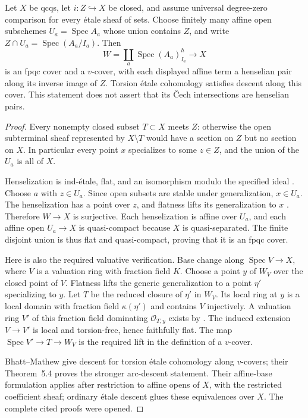 \begin{lemma}\label{B:henselized-affine-cover}
Let $X$ be qcqs, let $i:Z\hookrightarrow X$ be closed, and assume
universal degree-zero comparison for every \'etale sheaf of sets.
Choose finitely many affine open subschemes
$U_a=\operatorname{Spec}A_a$ whose union contains $Z$, and write
$Z\cap U_a=\operatorname{Spec}(A_a/I_a)$. Then
\[
 W=\coprod_a\operatorname{Spec}(A_a)^h_{I_a}\longrightarrow X
\]
is an fpqc cover and a $v$-cover, with each displayed affine term
a henselian pair along its inverse image of $Z$. Torsion \'etale
cohomology satisfies descent along this cover. This statement
does not assert that its \v Cech intersections are henselian pairs.
\end{lemma}
\begin{proof}
Every nonempty closed subset $T\subset X$ meets $Z$: otherwise
the open subterminal sheaf represented by $X\setminus T$ would
have a section on $Z$ but no section on $X$. In particular every
point $x$ specializes to some $z\in Z$, and the union of the
$U_a$ is all of $X$.

Henselization is ind-\'etale, flat, and an isomorphism modulo the
specified ideal \cite[Tag 0AGU]{BStacks}. Choose $a$ with
$z\in U_a$. Since open subsets are stable under generalization,
$x\in U_a$. The henselization has a point over $z$, and flatness
lifts its generalization to $x$ \cite[Tag 03HV]{BStacks}.
Therefore $W\to X$ is surjective. Each henselization is affine
over $U_a$, and each affine open $U_a\to X$ is quasi-compact
because $X$ is quasi-separated. The finite disjoint union is
thus flat and quasi-compact, proving that it is an fpqc cover.

Here is also the required valuative verification. Base change
along $\operatorname{Spec}V\to X$, where $V$ is a valuation
ring with fraction field $K$. Choose a point $y$ of $W_V$ over
the closed point of $V$. Flatness lifts the generic
generalization to a point $\eta'$ specializing to $y$. Let $T$
be the reduced closure of $\eta'$ in $W_V$. Its local ring at
$y$ is a local domain with fraction field $\kappa(\eta')$ and
contains $V$ injectively. A valuation ring $V'$ of this fraction
field dominating $\mathcal O_{T,y}$ exists by
\cite[Tag 00IA]{BStacks}. The induced extension $V\to V'$ is
local and torsion-free, hence faithfully flat. The map
$\operatorname{Spec}V'\to T\to W_V$ is the required lift in
the definition of a $v$-cover.

Bhatt--Mathew \cite[Lemma 5.1 and Proposition 5.2]{BBhattMathew2021}
give descent for torsion \'etale cohomology along $v$-covers;
their Theorem~5.4 proves the stronger arc-descent statement.
Their affine-base formulation applies after restriction to
affine opens of $X$, with the restricted coefficient sheaf;
ordinary \'etale descent glues these equivalences over $X$.
The complete cited proofs were opened.
\end{proof}

